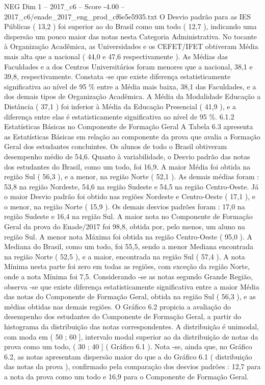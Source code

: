 \begin{textsample}{NEG Dim 1 – 2017\_c6 – Score -4.00 – 2017\_c6/enade\_2017\_eng\_prod\_cf6e5e5935.txt}
O Desvio padrão para as IES Públicas ( 13,2 ) foi superior ao do Brasil como um todo ( 12,7 ), indicando uma dispersão um pouco maior das notas nesta Categoria Administrativa.
No tocante à Organização Acadêmica, as Universidades e os CEFET/IFET obtiveram Média mais alta que a nacional ( 44,0 e 47,6 respectivamente ).
As Médias das Faculdades e a dos Centros Universitários foram menores que a nacional, 38,1 e 39,8, respectivamente.
Constata -se que existe diferença estatisticamente significativa ao nível de 95 \% entre a Média mais baixa, 38,1 das Faculdades, e a dos demais tipos de Organização Acadêmica.
A Média da Modalidade Educação a Distância ( 37,1 ) foi inferior à Média da Educação Presencial ( 41,9 ), e a diferença entre elas é estatisticamente significativa ao nível de 95 \%. 6.1.2 Estatísticas Básicas no Componente de Formação Geral A Tabela 6.3 apresenta as Estatísticas Básicas em relação ao componente da prova que avalia a Formação Geral dos estudantes concluintes.
Os alunos de todo o Brasil obtiveram desempenho médio de 54,6.
Quanto à variabilidade, o Desvio padrão das notas dos estudantes do Brasil, como um todo, foi 16,9.
A maior Média foi obtida na região Sul ( 56,3 ), e a menor, na região Norte ( 52,1 ).
As demais médias foram : 53,8 na região Nordeste, 54,6 na região Sudeste e 54,5 na região Centro-Oeste.
Já o maior Desvio padrão foi obtido nas regiões Nordeste e Centro-Oeste ( 17,1 ), e o menor, na região Norte ( 15,9 ).
Os demais desvios padrões foram : 17,0 na região Sudeste e 16,4 na região Sul.
A maior nota no Componente de Formação Geral da prova do Enade/2017 foi 98,8, obtida por, pelo menos, um aluno na região Sul.
A menor nota Máxima foi obtida na região Centro-Oeste ( 95,0 ).
A Mediana do Brasil, como um todo, foi 55,5, sendo a menor Mediana encontrada na região Norte ( 52,5 ), e a maior, encontrada na região Sul ( 57,4 ).
A nota Mínima nesta parte foi zero em todas as regiões, com exceção da região Norte, onde a nota Mínima foi 7,5.
Considerando -se as notas segundo Grande Região, observa -se que existe diferença estatisticamente significativa entre a maior Média das notas do Componente de Formação Geral, obtida na região Sul ( 56,3 ), e as médias obtidas nas demais regiões.
O Gráfico 6.2 propicia a avaliação do desempenho dos estudantes do Componente de Formação Geral, a partir do histograma da distribuição das notas correspondentes.
A distribuição é unimodal, com moda em ( 50 ; 60 ], intervalo modal superior ao da distribuição de notas da prova como um todo, ( 30 ; 40 ] ( Gráfico 6.1 ).
Nota -se, ainda que, no Gráfico 6.2, as notas apresentam dispersão maior do que a do Gráfico 6.1 ( distribuição das notas da prova ), confirmado pela comparação dos desvios padrões : 12,7 para a nota da prova como um todo e 16,9 para o Componente de Formação Geral.

\end{textsample}
